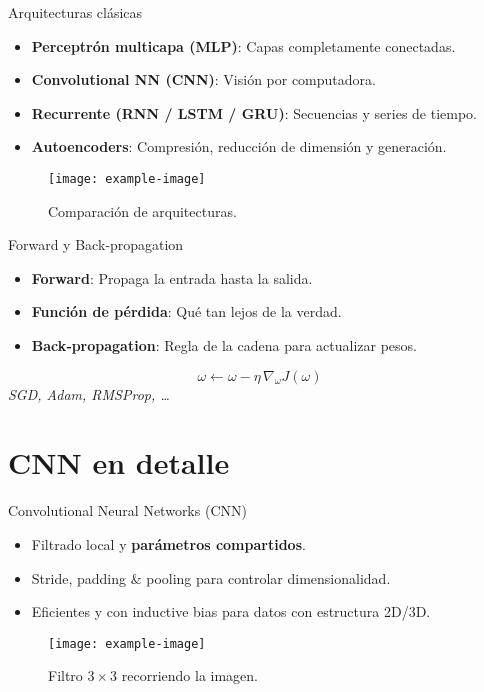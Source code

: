 \documentclass[12pt,spanish]{beamer}
\begin{document}
\begin{frame}{Arquitecturas clásicas}
  \begin{itemize}
    \item \textbf{Perceptrón multicapa (MLP)}: Capas completamente conectadas.
    \item \textbf{Convolutional NN (CNN)}: Visión por computadora.
    \item \textbf{Recurrente (RNN / LSTM / GRU)}: Secuencias y series de tiempo.
    \item \textbf{Autoencoders}: Compresión, reducción de dimensión y generación.
  \end{itemize}
  \begin{figure}
    \centering
    \texttt{[image: example-image]}
    \caption{Comparación de arquitecturas.}
  \end{figure}
\end{frame}

\begin{frame}{Forward y Back‑propagation}
  \begin{itemize}
    \item \textbf{Forward}: Propaga la entrada hasta la salida.
    \item \textbf{Función de pérdida}: Qué tan lejos de la verdad.
    \item \textbf{Back‑propagation}: Regla de la cadena para actualizar pesos.
  \end{itemize}
  \begin{equation*}
    \omega \leftarrow \omega - \eta\,\nabla_{\!\omega}J(\omega)
  \end{equation*}
  \pause
  \textit{SGD, Adam, RMSProp, \ldots}
\end{frame}

\section{CNN en detalle}
\begin{frame}{Convolutional Neural Networks (CNN)}
  \begin{itemize}
    \item Filtrado local y \textbf{parámetros compartidos}.  
    \item Stride, padding \& pooling para controlar dimensionalidad.
    \item Eficientes y con inductive bias para datos con estructura 2D/3D.
  \end{itemize}
  \begin{figure}
    \centering
    \texttt{[image: example-image]}
    \caption{Filtro $3\times3$ recorriendo la imagen.}
  \end{figure}
\end{frame}
\end{document}
